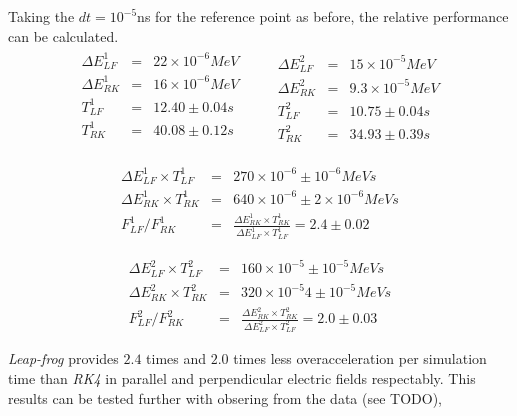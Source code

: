 \documentclass[a4paper,oneside,12pt]{report}
\numberwithin{equation}{chapter}
\begin{document}
Taking the $dt=10^{-5}$ns for the reference point as before, the relative performance can be calculated.
\begin{eqnarray*}
    \begin{aligned}
        \Delta E_{LF}^1 &=& 22 \times 10^{-6} MeV \\
        \Delta E_{RK}^1 &=& 16 \times 10^{-6} MeV \\
        T_{LF}^1 &=& 12.40 \pm 0.04 s \\
        T_{RK}^1 &=& 40.08 \pm 0.12 s \\
    \end{aligned}
    \qquad
    \begin{aligned}
        \Delta E_{LF}^2 &=& 15 \times 10^{-5} MeV \\
        \Delta E_{RK}^2 &=& 9.3 \times 10^{-5} MeV \\
        T_{LF}^2 &=& 10.75 \pm 0.04 s \\
        T_{RK}^2 &=& 34.93 \pm 0.39 s 
    \end{aligned}
\end{eqnarray*}

\begin{eqnarray} \label{eq:f_lf_rk_1}
    \Delta E_{LF}^1 \times T_{LF}^1 &=& 270 \times 10^{-6} \pm 10^{-6} MeV s \nonumber\\ %
    \Delta E_{RK}^1 \times T_{RK}^1 &=& 640 \times 10^{-6} \pm 2\times 10^{-6}  MeV s \nonumber\\ %
    F_{LF}^1/F_{RK}^1 &=& \frac{\Delta E_{RK}^1 \times T_{RK}^1 }{\Delta E_{LF}^1 \times T_{LF}^1} = 2.4 \pm 0.02
\end{eqnarray}

\begin{eqnarray} \label{eq:f_lf_rk_2}
    \Delta E_{LF}^2 \times T_{LF}^2 &=& 160 \times 10^{-5} \pm 10^{-5} MeV s \nonumber\\ %
    \Delta E_{RK}^2 \times T_{RK}^2 &=& 320 \times 10^{-5} 4 \pm 10^{-5} MeV s \nonumber\\ %
    F_{LF}^2/F_{RK}^2 &=& \frac{\Delta E_{RK}^2 \times T_{RK}^2 }{\Delta E_{LF}^2 \times T_{LF}^2} = 2.0  \pm 0.03
\end{eqnarray}

\textit{Leap-frog} provides $2.4$ times and $2.0$ times less overacceleration per simulation time than \textit{RK4} in parallel and perpendicular electric fields respectably.
This results can be tested further with obsering from the data (see TODO),
\end{document}
